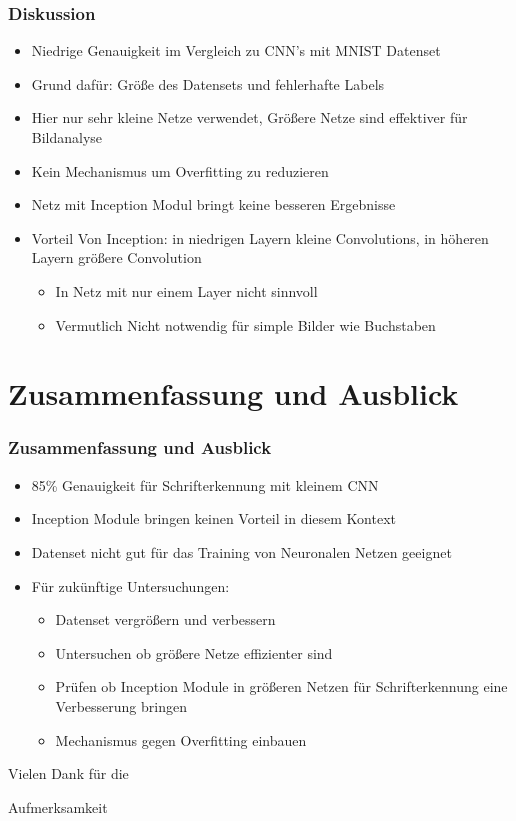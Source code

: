 \documentclass{beamer}
\begin{document}
\begin{frame}
	\frametitle{Diskussion}
	\begin{itemize}
		\item Niedrige Genauigkeit im Vergleich zu CNN's mit MNIST Datenset
		\item Grund dafür: Größe des Datensets und fehlerhafte Labels
		\item Hier nur sehr kleine Netze verwendet, Größere Netze sind effektiver für Bildanalyse
		\item Kein Mechanismus um Overfitting zu reduzieren
		\item Netz mit Inception Modul bringt keine besseren Ergebnisse
		\item Vorteil Von Inception: in niedrigen Layern kleine Convolutions, in höheren Layern größere Convolution
		\begin{itemize}
			\item In Netz mit nur einem Layer nicht sinnvoll
			\item Vermutlich Nicht notwendig für simple Bilder wie Buchstaben
		\end{itemize}
	\end{itemize}
\end{frame}

\section{Zusammenfassung und Ausblick}

\begin{frame}
	\frametitle{Zusammenfassung und Ausblick}
	\begin{itemize}
		\item 85\% Genauigkeit für Schrifterkennung mit kleinem CNN
		\item Inception Module bringen keinen Vorteil in diesem Kontext
		\item Datenset nicht gut für das Training von Neuronalen Netzen geeignet
		\item Für zukünftige Untersuchungen:
		\begin{itemize}
			\item Datenset vergrößern und verbessern
			\item Untersuchen ob größere Netze effizienter sind
			\item Prüfen ob Inception Module in größeren Netzen für Schrifterkennung eine Verbesserung bringen
			\item Mechanismus gegen Overfitting einbauen
		\end{itemize}		
	\end{itemize}
\end{frame}


\begin{frame}
\Huge{\centerline{Vielen Dank für die}}
\Huge{\centerline{Aufmerksamkeit}}
\end{frame}

\end{document}
